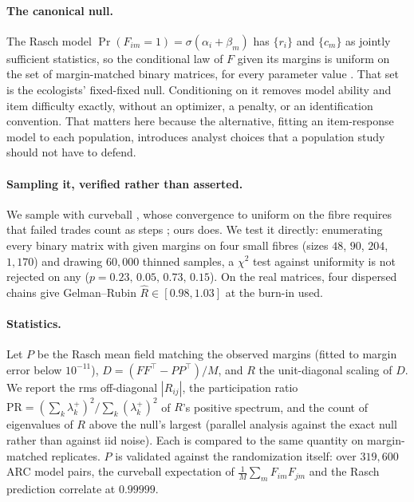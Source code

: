 \documentclass{article}
\begin{document}
\paragraph{The canonical null.} The Rasch model $\Pr(F_{im}=1)=\sigma(\alpha_i+\beta_m)$ has
$\{r_i\}$ and $\{c_m\}$ as jointly sufficient statistics, so the conditional law of $F$ given its
margins is uniform on the set of margin-matched binary matrices, for every parameter value
\citep{rasch1960,andersen1973}. That set is the ecologists' fixed-fixed null. Conditioning on it
removes model ability and item difficulty exactly, without an optimizer, a penalty, or an
identification convention. That matters here because the alternative, fitting an item-response
model to each population, introduces analyst choices that a population study should not have to
defend.

\paragraph{Sampling it, verified rather than asserted.} We sample with curveball
\citep{strona2014}, whose convergence to uniform on the fibre requires that failed trades count as
steps \citep{carstens2015}; ours does. We test it directly: enumerating every binary matrix with
given margins on four small fibres (sizes $48$, $90$, $204$, $1{,}170$) and drawing $60{,}000$
thinned samples, a $\chi^2$ test against uniformity is not rejected on any
($p=0.23,\,0.05,\,0.73,\,0.15$). On the real matrices, four dispersed chains give Gelman--Rubin
$\hat R\in[0.98,1.03]$ at the burn-in used.

\paragraph{Statistics.} Let $P$ be the Rasch mean field matching the observed margins (fitted to
margin error below $10^{-11}$), $D=(FF^{\!\top}-PP^{\!\top})/M$, and $R$ the unit-diagonal scaling
of $D$. We report the rms off-diagonal $|R_{ij}|$, the participation ratio
$\mathrm{PR}=(\sum_k\lambda_k^{+})^2/\sum_k(\lambda_k^{+})^2$ of $R$'s positive spectrum, and the
count of eigenvalues of $R$ above the null's largest (parallel analysis against the exact null
rather than against iid noise). Each is compared to the same quantity on margin-matched replicates.
$P$ is validated against the randomization itself: over $319{,}600$ ARC model pairs, the curveball
expectation of $\frac1M\sum_m F_{im}F_{jm}$ and the Rasch prediction correlate at $0.99999$.
\end{document}
